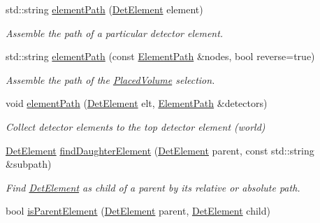 \begin{DoxyCompactItemize}
std\+::string \hyperlink{namespace_d_d4hep_1_1_geometry_1_1_detector_tools_aa236d3ca69ed2eb4d7777db7c080216b}{element\+Path} (\hyperlink{class_d_d4hep_1_1_geometry_1_1_det_element}{Det\+Element} element)
\begin{DoxyCompactList}\small\item\em Assemble the path of a particular detector element. \end{DoxyCompactList}\item 
std\+::string \hyperlink{namespace_d_d4hep_1_1_geometry_1_1_detector_tools_a67f5a1f1c0ed6ca5698a3323fc660379}{element\+Path} (const \hyperlink{namespace_d_d4hep_1_1_geometry_1_1_detector_tools_a57c8f37a975258fd84676a69e74c56ab}{Element\+Path} \&nodes, bool reverse=true)
\begin{DoxyCompactList}\small\item\em Assemble the path of the \hyperlink{class_d_d4hep_1_1_geometry_1_1_placed_volume}{Placed\+Volume} selection. \end{DoxyCompactList}\item 
void \hyperlink{namespace_d_d4hep_1_1_geometry_1_1_detector_tools_a10418f7d98665f48f0dcb14a02919fea}{element\+Path} (\hyperlink{class_d_d4hep_1_1_geometry_1_1_det_element}{Det\+Element} elt, \hyperlink{namespace_d_d4hep_1_1_geometry_1_1_detector_tools_a57c8f37a975258fd84676a69e74c56ab}{Element\+Path} \&detectors)
\begin{DoxyCompactList}\small\item\em Collect detector elements to the top detector element (world) \end{DoxyCompactList}\item 
\hyperlink{class_d_d4hep_1_1_geometry_1_1_det_element}{Det\+Element} \hyperlink{namespace_d_d4hep_1_1_geometry_1_1_detector_tools_a142393e7b88829aee063f35a8e7cb984}{find\+Daughter\+Element} (\hyperlink{class_d_d4hep_1_1_geometry_1_1_det_element}{Det\+Element} parent, const std\+::string \&subpath)
\begin{DoxyCompactList}\small\item\em Find \hyperlink{class_d_d4hep_1_1_geometry_1_1_det_element}{Det\+Element} as child of a parent by it\textquotesingle{}s relative or absolute path. \end{DoxyCompactList}\item 
bool \hyperlink{namespace_d_d4hep_1_1_geometry_1_1_detector_tools_a9e02ef062540b4e9c0d284f50106f203}{is\+Parent\+Element} (\hyperlink{class_d_d4hep_1_1_geometry_1_1_det_element}{Det\+Element} parent, \hyperlink{class_d_d4hep_1_1_geometry_1_1_det_element}{Det\+Element} child)

\end{DoxyCompactItemize}
